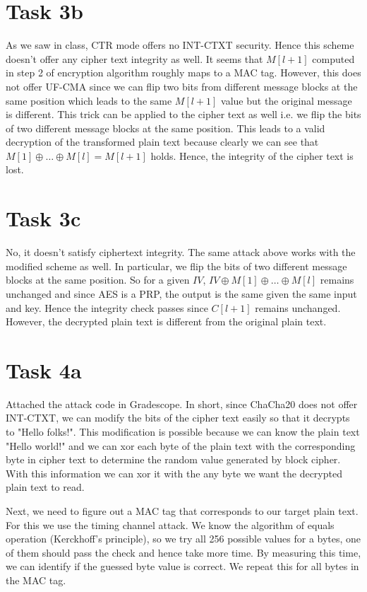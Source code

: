 \documentclass{article}
\begin{document}
    \section*{Task 3b}
    As we saw in class, CTR mode offers no INT-CTXT security. Hence this scheme doesn't offer any cipher text integrity as well. It seems that $M[l+1]$ computed in step 2 of encryption algorithm roughly maps to a MAC tag. However, this does not offer UF-CMA since we can flip two bits from different message blocks at the same position which leads to the same $M[l+1]$ value but the original message is different. This trick can be applied to the cipher text as well i.e. we flip the bits of two different message blocks at the same position. This leads to a valid decryption of the transformed plain text because clearly we can see that $M[1] \oplus \dots \oplus M[l] = M[l+1]$ holds. Hence, the integrity of the cipher text is lost.

    \section*{Task 3c}
    No, it doesn't satisfy ciphertext integrity. The same attack above works with the modified scheme as well. In particular, we flip the bits of two different message blocks at the same position. So for a given $IV$, $IV \oplus M[1] \oplus \dots \oplus M[l]$ remains unchanged and since AES is a PRP, the output is the same given the same input and key. Hence the integrity check passes since $C[l+1]$ remains unchanged. However, the decrypted plain text is different from the original plain text.

    \section*{Task 4a}
    Attached the attack code in Gradescope. In short, since ChaCha20 does not offer INT-CTXT, we can modify the bits of the cipher text easily so that it decrypts to "Hello folks!". This modification is possible because we can know the plain text "Hello world!" and we can xor each byte of the plain text with the corresponding byte in cipher text to determine the random value generated by block cipher. With this information we can xor it with the any byte we want the decrypted plain text to read.

    Next, we need to figure out a MAC tag that corresponds to our target plain text. For this we use the timing channel attack. We know the algorithm of equals operation (Kerckhoff's principle), so we try all 256 possible values for a bytes, one of them should pass the check and hence take more time. By measuring this time, we can identify if the guessed byte value is correct. We repeat this for all bytes in the MAC tag.
\end{document}
